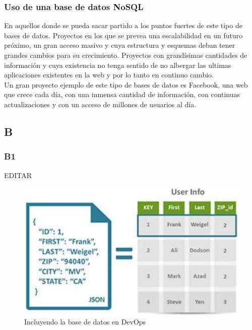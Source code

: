 \documentclass[preprint,12pt]{elsarticle}
\begin{document}
\subsubsection{\textbf{Uso de una base de datos NoSQL}}

En aquellos donde se pueda sacar partido a los puntos fuertes de este tipo de bases de datos. Proyectos en los que se prevea una escalabilidad en un futuro próximo, un gran acceso masivo y cuya estructura y esquemas deban tener grandes cambios para su crecimiento. Proyectos con grandísimas cantidades de información y cuya existencia no tenga sentido de no albergar las ultimas aplicaciones existentes en la web y por lo tanto en continuo cambio.
\\
Un gran proyecto ejemplo de este tipo de bases de datos es Facebook, una web que crece cada día, con una inmensa cantidad de información, con continuas actualizaciones y con un acceso de millones de usuarios al día.



\subsection{\textbf{B}}

\subsubsection{\textbf{B1}}

EDITAR\\

\begin{figure}[htb]
	\begin{center}
		\includegraphics[width=14cm]{./IMAGENES/basededatos_1} 
		\caption{Incluyendo la base de datos en DevOps}
	\end{center}
\end{figure}
\end{document}
